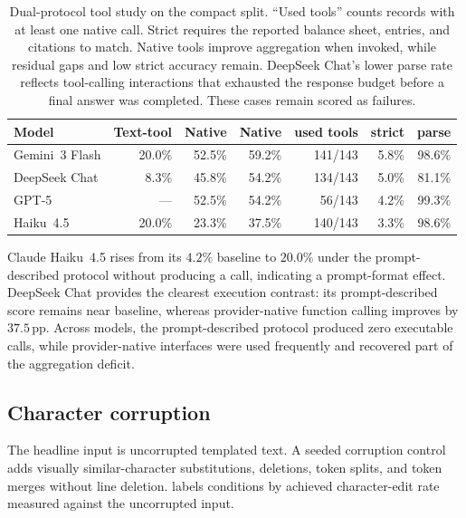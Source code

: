 \begin{table}[t]
\centering
\footnotesize
\setlength{\tabcolsep}{4pt}
\begin{tabular}{@{}lrrrrrr@{}}
\toprule
Model & Text-tool \bsexact{} & Native \bsexact{} & Native \bsrecon{} & used tools & strict & parse \\
\midrule
Gemini~3 Flash & 20.0\% & 52.5\% & 59.2\% & 141/143 & 5.8\% & 98.6\% \\
DeepSeek Chat & 8.3\% & 45.8\% & 54.2\% & 134/143 & 5.0\% & 81.1\% \\
GPT-5 & --- & 52.5\% & 54.2\% & 56/143 & 4.2\% & 99.3\% \\
Haiku~4.5 & 20.0\% & 23.3\% & 37.5\% & 140/143 & 3.3\% & 98.6\% \\
\bottomrule
\end{tabular}
\caption{Dual-protocol tool study on the compact split. ``Used tools'' counts records with at least one native call. Strict requires the reported balance sheet, entries, and citations to match. Native tools improve aggregation when invoked, while residual gaps and low strict accuracy remain. DeepSeek Chat's lower parse rate reflects tool-calling interactions that exhausted the response budget before a final answer was completed. These cases remain scored as failures.}
\label{tab:native-tools}
\end{table}

Claude Haiku~4.5 rises from its $4.2\%$ baseline to $20.0\%$ under the prompt-described protocol without producing a call, indicating a prompt-format effect. DeepSeek Chat provides the clearest execution contrast: its prompt-described score remains near baseline, whereas provider-native function calling improves \bsexact{} by $37.5$\,pp. Across models, the prompt-described protocol produced zero executable calls, while provider-native interfaces were used frequently and recovered part of the aggregation deficit.

\subsection{Character corruption}
\label{appx:ocr-noise}

The headline input is uncorrupted templated text. A seeded corruption control adds visually similar-character substitutions, deletions, token splits, and token merges without line deletion.  labels conditions by achieved character-edit rate measured against the uncorrupted input.

